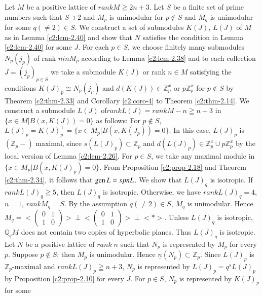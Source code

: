 \setcounter{proofofthm}{35}
\begin{proofofthm}%
Let $M$ be a positive lattice of $rank M \geqq 2n +3$. Let $S$ be a
finite set of prime numbers such that $S\ni 2$ and $M_p$ is unimodular
for $p\not\in S$ and $M_q$ is unimodular for some $q(\neq
2)\in S$. We construct a set of submodules $K(J)$, $L(J)$ of
$M$ as in Lemma \ref{c2:lem-2.40} and show that $N$ satisfies the condition in
Lemma \ref{c2:lem-2.40} for some $J$. For each $p\in S$, we choose finitely
many submodules $N_p(j_p)$ of rank $n in M_p$ according to Lemma
\ref{c2:lem-2.38} and to each collection $J=(j_p)_{p\in S}$ we take a
submodule $K(J)$ or rank $n \in M$ satisfying the conditions
$K(J)_p \cong N_p (j_p)$ and $d(K(J)) \in \mathbb{Z}^x_p$ or
$p\mathbb{Z}^x_p$ for $p\not\in S$ by Theorem \ref{c2:thm-2.33} and
Corollary \ref{c2:coro-4}  to
Theorem \ref{c2:thm-2.14}. We construct a submodule $L(J)$ of\pageoriginale $rank
L(J) =rank M-n \geqq n +3$ in $\{x\in M|B(x, K(J))=0 \}$ as
follows:
For $p\not\in S$, $L(J)_p=K(J)^{\perp}_p=\{ x\in M_p|B(x,
K(J_p))=0\}$. In this case, $L(J)_p$ is $(\mathbb{Z}_p-)$ maximal,
since $s(L(J)_p) \subset \mathbb{Z}_p$ and
$d(L(J)_p) \in \mathbb{Z}^x_p \cup p \mathbb{Z}^x_p$ by the local
version of Lemma \ref{c2:lem-2.26}. For $p\in S$, we take any maximal module in
$\{x\in M_p |B(x,K(J)_p)=0 \}$. From Proposition \ref{c2:prop-2.18} and
Theorem \ref{c2:thm-2.34}, it follows that $\operatorname{gen} L = spn L$. We show that $L(J)_q$
is isotropic. If $rank L(J)_q \geqq 5$, then $L(J)_q$ is
isotropic. Otherwise, we have $rank L(J)_q=4$, $n=1$, $rank M_q=S$. By
the assumption $q(\neq 2) \in S$, $M_q$ is unimodular. Hence
$M_q=<\left(\begin{smallmatrix}
0&1\\1&0
\end{smallmatrix}\right)> \perp <\left(\begin{smallmatrix}
0&1\\1&0
\end{smallmatrix}\right)> \perp <\ast>$. Unless $L(J)_q$ is isotropic,
$\mathbb{Q}_qM$ does not contain two copies of hyperbolic planes. Thus
$L(J)_q$ is isotropic. Let $N$ be a positive lattice of $rank \; n$ such
that $N_p$ is represented by $M_p$ for every $p$. Suppose $p\not\in
S$; then $M_p$ is unimodular. Hence
$\underline{n}(N_p)\subset \mathbb{Z}_p$. Since $L(J)_p$ is
$\mathbb{Z}_p$-maximal and $rank L(J)_p\geqq n+3$, $N_p$ is
represented by $L(J)_p =q^sL(J)_p$ by Proposition \ref{c2:prop-2.10} for every
$J$. For $p\in S$, $N_p$ is represented by $K(J)_p$ for some

\end{proofofthm}

